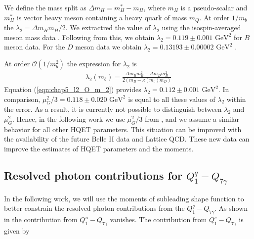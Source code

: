 We define the mass split as $\Delta m_H=m_H^*-m_H$, where $m_H$ is a pseudo-scalar and $m_H^*$ is vector heavy meson containing a heavy quark of mass $m_Q$. 
At order $1/m_b$ the $\lambda_2=\Delta m_Hm_H/2$. We extractred the value of $\lambda_2$ using the isospin-averaged meson mass data \cite{Tanabashi:2018oca}. Following from this, we obtain $\lambda_2=0.119\pm 0.001\mbox{ GeV}^2$ for $B$ meson data. For the $D$ meson data we obtain $\lambda_2=0.13193\pm0.00002\mbox{ GeV}^2$ \cite{Gunawardana:2019gep}.\par
At order $\mathcal{O}(1/m_b^2)$ the expression for $\lambda_2$ is \cite{Gremm:1996df}
\begin{eqnarray}\label{eqn:chap5_l2_O_m_2}
\lambda_{2}\left(m_{b}\right)=\frac{\Delta m_{B} m_{B}^{2}-\Delta m_{D} m_{D}^{2}}{2\left(m_{B}-\kappa\left(m_{c}\right) m_{D}\right)}
\end{eqnarray} 
Equation (\ref{eqn:chap5_l2_O_m_2}) provides $\lambda_2=0.112\pm 0.001\mbox{ GeV}^2$. In comparison, $\mu_G^2/3=0.118\pm 0.020\mbox{ GeV}^2$  \cite{Gambino:2016jkc} is equal to all these values of $\lambda_2$ within the error. As a result, it is currently not possible to distinguish between $\lambda_2$ and $\mu_G^2$. Hence, in the following work we use $\mu_G^2/3$ from \cite{Gambino:2016jkc}, and we assume a similar behavior for all other HQET parameters. This situation can be improved with the availability of the future Belle II data and Lattice QCD. These new data can improve the estimates of HQET parameters and the moments. 

\subsection{Resolved photon contributions for $Q^q_1-Q_{7\gamma}$}

In the following work, we will use the moments of subleading shape function to better constrain the resolved photon contributions from the $Q_1^q-Q_{7\gamma}$. As shown in \cite{Benzke:2010js} the contribution from $Q^u_1-Q_{7\gamma}$ vanishes. The contribution from $Q^c_1-Q_{7\gamma}$ is given by

